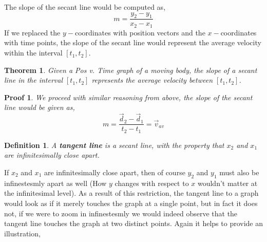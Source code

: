 \documentclass[12pt]{article}
\theoremstyle{break}
\newtheorem{thm}{Theorem}[subsection]
\newtheorem*{pf}{Proof}
\newtheorem{defn}{Definition}[subsection]
\begin{document}
The slope of the secant line would be computed as,
$$m = \frac{y_2 - y_1}{x_2 - x_1}$$
If we replaced the $y-$coordinates with position vectors and the $x-$coordinates with time points, the slope of the secant line would represent the average velocity within the interval $[t_1,t_2]$.

\begin{thm}
Given a Pos v. Time graph of a moving body, the slope of a secant line in the interval $[t_1,t_2]$ represents the average velocity between $[t_1,t_2]$.
\end{thm}
\begin{pf}
	We proceed with similar reasoning from above, the slope of the secant line would be given as,
	$$m = \frac{\vec d_2 - \vec d_1}{t_2 - t_1} = \vec v_{av}$$
\end{pf}
\begin{defn}
A \textbf{tangent line} is a secant line, with the property that $x_2$ and $x_1$ are infinitesimally close apart.
\end{defn}
If $x_2$ and $x_1$ are infinitesimally close apart, then of course $y_2$ and $y_1$ must also be infinestesmly apart as well (How $y$ changes with respect to $x$ wouldn't matter at the infinitesimal level). As a result of this restriction, the tangent line to a graph would look as if it merely touches the graph at a single point, but in fact it does not, if we were to zoom in infinestesmly we would indeed observe that the tangent line touches the graph at two distinct points. Again it helps to provide an illustration,


\begin{center}
\end{center}
\end{document}
